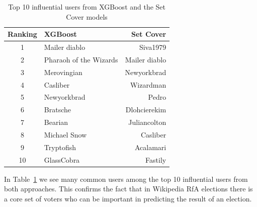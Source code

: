 \begin{table}[!ht]
    \centering
    \caption{Top 10 influential users from XGBoost and the Set Cover models}
    \label{tab:top-10}
    \begin{tabular}{clr}
        \toprule
        Ranking&XGBoost&Set Cover\\
        \midrule
        1& Mailer diablo & Siva1979\\
        2&Pharaoh of the Wizards&Mailer diablo\\
        3&Merovingian&Newyorkbrad\\
        4&Casliber&Wizardman\\
        5&Newyorkbrad&Pedro\\
        6&Bratsche&Dlohcierekim\\
        7&Bearian&Juliancolton\\
        8&Michael Snow&Casliber\\
        9&Tryptofish&Acalamari\\
        10&GlassCobra&Fastily\\
        \bottomrule
    \end{tabular}
\end{table}
In Table~\ref{tab:top-10} we see many common users among the top 10 influential users from both approaches. This confirms the fact that in Wikipedia RfA elections there is a core set of voters who can be important in predicting the result of an election.